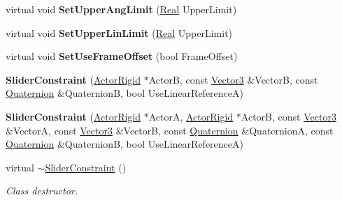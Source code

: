 \begin{DoxyCompactItemize}
\item 
\hypertarget{classMezzanine_1_1SliderConstraint_a66e110523ec0273ec034bdb8926dbe00}{
virtual void {\bfseries SetUpperAngLimit} (\hyperlink{namespaceMezzanine_a726731b1a7df72bf3583e4a97282c6f6}{Real} UpperLimit)}
\label{classMezzanine_1_1SliderConstraint_a66e110523ec0273ec034bdb8926dbe00}

\item 
\hypertarget{classMezzanine_1_1SliderConstraint_a8ae21f3302205ea4741adc8a05817a02}{
virtual void {\bfseries SetUpperLinLimit} (\hyperlink{namespaceMezzanine_a726731b1a7df72bf3583e4a97282c6f6}{Real} UpperLimit)}
\label{classMezzanine_1_1SliderConstraint_a8ae21f3302205ea4741adc8a05817a02}

\item 
\hypertarget{classMezzanine_1_1SliderConstraint_a5402cffa565acf077aff46a1e2556bd9}{
virtual void {\bfseries SetUseFrameOffset} (bool FrameOffset)}
\label{classMezzanine_1_1SliderConstraint_a5402cffa565acf077aff46a1e2556bd9}

\item 
\hypertarget{classMezzanine_1_1SliderConstraint_a2f173d23f75cf90a91fbe2542d7ccd10}{
{\bfseries SliderConstraint} (\hyperlink{classMezzanine_1_1ActorRigid}{ActorRigid} $\ast$ActorB, const \hyperlink{classMezzanine_1_1Vector3}{Vector3} \&VectorB, const \hyperlink{classMezzanine_1_1Quaternion}{Quaternion} \&QuaternionB, bool UseLinearReferenceA)}
\label{classMezzanine_1_1SliderConstraint_a2f173d23f75cf90a91fbe2542d7ccd10}

\item 
\hypertarget{classMezzanine_1_1SliderConstraint_aaeb70964ae4b2568a1dd70595f0d8567}{
{\bfseries SliderConstraint} (\hyperlink{classMezzanine_1_1ActorRigid}{ActorRigid} $\ast$ActorA, \hyperlink{classMezzanine_1_1ActorRigid}{ActorRigid} $\ast$ActorB, const \hyperlink{classMezzanine_1_1Vector3}{Vector3} \&VectorA, const \hyperlink{classMezzanine_1_1Vector3}{Vector3} \&VectorB, const \hyperlink{classMezzanine_1_1Quaternion}{Quaternion} \&QuaternionA, const \hyperlink{classMezzanine_1_1Quaternion}{Quaternion} \&QuaternionB, bool UseLinearReferenceA)}
\label{classMezzanine_1_1SliderConstraint_aaeb70964ae4b2568a1dd70595f0d8567}

\item 
virtual \hyperlink{classMezzanine_1_1SliderConstraint_a61867229e5eb1192119b496b12beb825}{$\sim$SliderConstraint} ()
\begin{DoxyCompactList}\small\item\em Class destructor. \item\end{DoxyCompactList}\end{DoxyCompactItemize}
